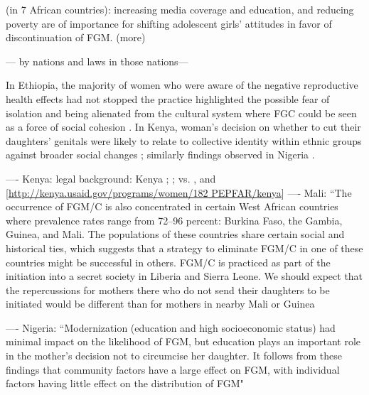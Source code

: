 \documentclass[12pt,]{article}
\begin{document}
\cite{DalaKalm18}(in 7 African countries): increasing media coverage and education, and reducing poverty are of importance for shifting adolescent girls' attitudes in favor of discontinuation of FGM.
\cite{Hayf05, PashPonn16} (more)




— by nations and laws in those nations—


In Ethiopia, the majority of women who were aware of the negative reproductive health effects had not stopped the practice highlighted the possible fear of isolation and being alienated from the cultural system where FGC could be seen as a force of social cohesion \cite{YirgKass12}.  In Kenya, woman's decision on whether to cut their daughters' genitals were likely to relate to collective identity within ethnic groups against broader social changes \cite{Achi14, Hayf05}; similarly findings observed in Nigeria \cite{FreyJohn07, KandMwek09}.


---- Kenya: legal background:  Kenya \cite{GKEN01}; \cite{UNIC13}; 
 vs. \cite{Chia14, Hayf05}, and [\url{http://kenya.usaid.gov/programs/women/182 PEPFAR/kenya}]
---- Mali: ``The occurrence of FGM/C is also concentrated in certain West African countries where prevalence rates range from 72–96 percent: Burkina Faso, the Gambia, Guinea, and Mali. The populations of these countries share certain social and historical ties, which suggests that a strategy to eliminate FGM/C in one of these countries might be successful in others. FGM/C is practiced as part of the initiation into a secret society in Liberia and Sierra Leone. We should expect that the repercussions for mothers there who do not send their daughters to be initiated would be different than for mothers in nearby Mali or Guinea \cite{YodaWang13}

---- Nigeria: ``Modernization (education and high socioeconomic status) had minimal impact on the likelihood of FGM, but education plays an important role in the mother's decision not to circumcise her daughter. It follows from these findings that community factors have a large effect on FGM, with individual factors having little effect on the distribution of FGM" \cite{KandNwak09}
\end{document}
